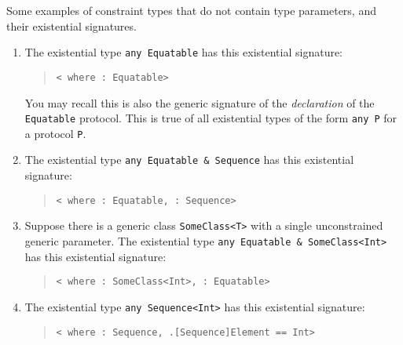 \documentclass[../generics]{subfiles}
\begin{document}
\begin{example}\label{existentialsigexample}
Some examples of constraint types that do not contain type parameters, and their existential signatures.
\begin{enumerate}
\item The existential type \texttt{any Equatable} has this existential signature:
\begin{quote}
\texttt{< where :\ Equatable>}
\end{quote}
You may recall this is also the generic signature of the \emph{declaration} of the \texttt{Equatable} protocol. This is true of all existential types of the form \texttt{any P} for a protocol \texttt{P}.

\item The existential type \texttt{any Equatable \& Sequence} has this existential signature:
\begin{quote}
\texttt{< where :\ Equatable, :\ Sequence>}
\end{quote}

\item Suppose there is a generic class \texttt{SomeClass<T>} with a single unconstrained generic parameter. The existential type \texttt{any Equatable \& SomeClass<Int>} has this existential signature:
\begin{quote}
\texttt{< where :\ SomeClass<Int>, :\ Equatable>}
\end{quote}

\item The existential type \texttt{any Sequence<Int>} has this existential signature:
\begin{quote}
\texttt{< where :\ Sequence, .[Sequence]Element == Int>}
\end{quote}
\end{enumerate}
\end{example}
\end{document}

